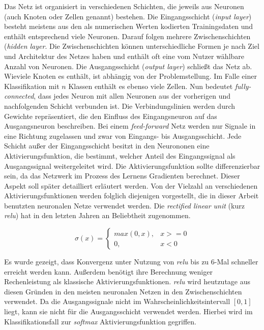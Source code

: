 \documentclass[a4paper,11pt]{article}
\begin{document}
Das Netz ist organisiert in verschiedenen Schichten, die jeweils aus Neuronen (auch Knoten oder Zellen genannt) bestehen. Die Eingangsschicht (\textit{input layer}) besteht meistens aus den als numerischen Werten kodierten Trainingsdaten und enthält entsprechend viele Neuronen. Darauf folgen mehrere Zwischenschichten (\textit{hidden layer}. Die Zwischenschichten können unterschiedliche Formen je nach Ziel und Architektur des Netzes haben und enthält oft eine vom Nutzer wählbare Anzahl von Neuronen. Die Ausgangsschicht (\textit{output layer}) schließt das Netz ab. Wieviele Knoten es enthält, ist abhängig von der Problemstellung. Im Falle einer Klassifikation mit $n$ Klassen enthält es ebenso viele Zellen. Nun bedeutet \textit{fully-connected}, dass jedes Neuron mit allen Neuronen aus der vorherigen und nachfolgenden Schicht verbunden ist. Die Verbindungslinien werden durch Gewichte repräsentiert, die den Einfluss des Eingangsneuron auf das Ausgangsneuron beschreiben. Bei einem \textit{feed-forward} Netz werden nur Signale in eine Richtung  zugelassen und zwar von Eingangs- bis Ausgangsschicht. Jede Schicht außer der Eingangsschicht besitzt in den Neurononen eine Aktivierungsfunktion, die bestimmt, welcher Anteil des Eingangssignal als Ausgangssignal weitergeleitet wird. Die Aktivierungsfunktion sollte differenzierbar sein, da das Netzwerk im Prozess des Lernens Gradienten berechnet. Dieser Aspekt soll später detailliert erläutert werden. Von der Vielzahl an verschiedenen Aktivierungsfunktionen werden folglich diejenigen vorgestellt, die in dieser Arbeit benutzten neuronalen Netze verwendet werden. Die \textit{rectified linear unit} (kurz \textit{relu}) hat in den letzten Jahren an Beliebtheit zugenommen.

\[\sigma(x) = 
\begin{cases}
max(0,x), & x >= 0 \\
0, & x <0
\end{cases}{}
\]

Es wurde gezeigt, dass Konvergenz unter Nutzung von \textit{relu} bis zu 6-Mal schneller erreicht werden kann. Außerdem benötigt ihre Berechnung weniger Rechenleistung als klassische Aktivierungsfunktionen. \textit{relu} wird heutzutage aus diesen Gründen in den meisten neuronalen Netzen in den Zwischenschichten verwendet. Da die Ausgangssignale nicht im Wahrscheinlichkeitsintervall $\left[0, 1\right]$ liegt, kann sie nicht für die Ausgangsschicht verwendet werden. Hierbei wird im Klassifikationsfall zur \textit{softmax} Aktivierungsfunktion gegriffen. 
\end{document}
